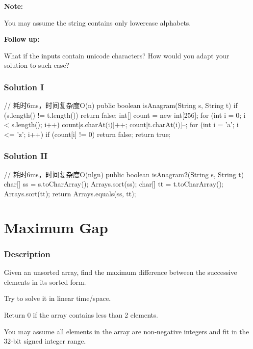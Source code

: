 \textbf{Note:}

You may assume the string contains only lowercase alphabets.

\textbf{Follow up:}

What if the inputs contain unicode characters? How would you adapt your solution to such case?

\subsubsection{Solution I}

\begin{Code}
// 耗时6ms，时间复杂度O(n)
public boolean isAnagram(String s, String t) {
    if (s.length() != t.length()) {
        return false;
    }
    int[] count = new int[256];
    for (int i = 0; i < s.length(); i++) {
        count[s.charAt(i)]++;
        count[t.charAt(i)]--;
    }
    for (int i = 'a'; i <= 'z'; i++) {
        if (count[i] != 0) {
            return false;
        }
    }
    return true;
}
\end{Code}

\subsubsection{Solution II}
\begin{Code}
// 耗时6ms，时间复杂度O(nlgn)
public boolean isAnagram2(String s, String t) {
    char[] ss = s.toCharArray();
    Arrays.sort(ss);
    char[] tt = t.toCharArray();
    Arrays.sort(tt);
    return Arrays.equals(ss, tt);
}
\end{Code}

\newpage

\section{Maximum Gap} %

\subsubsection{Description}
Given an unsorted array, find the maximum difference between the successive elements in its sorted form.

Try to solve it in linear time/space.

Return 0 if the array contains less than 2 elements.

You may assume all elements in the array are non-negative integers and fit in the 32-bit signed integer range.


